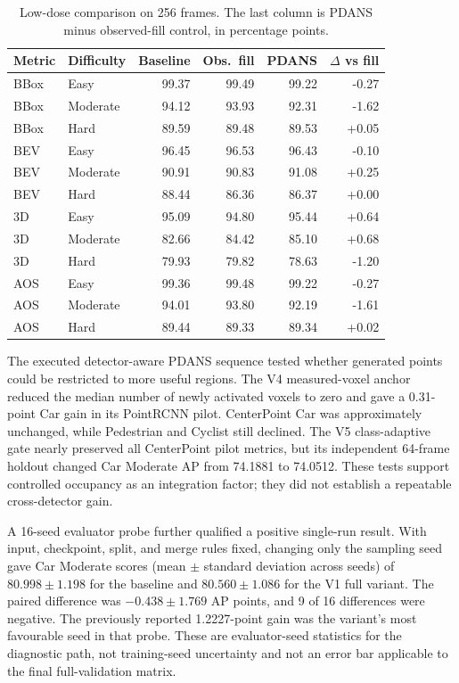 \begin{table}[!t]\centering\setlength{\tabcolsep}{4pt}
\begin{tabular}{llrrrr}\toprule
Metric & Difficulty & Baseline & Obs.\ fill & PDANS & $\Delta$ vs fill\\\midrule
BBox & Easy & 99.37 & 99.49 & 99.22 & -0.27 \\
BBox & Moderate & 94.12 & 93.93 & 92.31 & -1.62 \\
BBox & Hard & 89.59 & 89.48 & 89.53 & +0.05 \\
BEV & Easy & 96.45 & 96.53 & 96.43 & -0.10 \\
BEV & Moderate & 90.91 & 90.83 & 91.08 & +0.25 \\
BEV & Hard & 88.44 & 86.36 & 86.37 & +0.00 \\
3D & Easy & 95.09 & 94.80 & 95.44 & +0.64 \\
3D & Moderate & 82.66 & 84.42 & 85.10 & +0.68 \\
3D & Hard & 79.93 & 79.82 & 78.63 & -1.20 \\
AOS & Easy & 99.36 & 99.48 & 99.22 & -0.27 \\
AOS & Moderate & 94.01 & 93.80 & 92.19 & -1.61 \\
AOS & Hard & 89.44 & 89.33 & 89.34 & +0.02 \\
\bottomrule\end{tabular}
\caption{Low-dose comparison on 256 frames. The last column is PDANS
minus observed-fill control, in percentage points.}
\label{tab:k-dose-control}\end{table}

The executed detector-aware PDANS sequence tested whether generated
points could be restricted to more useful regions. The V4 measured-voxel
anchor reduced the median number of newly activated voxels to zero and
gave a 0.31-point Car gain in its PointRCNN pilot. CenterPoint Car
was approximately unchanged, while Pedestrian and Cyclist still declined.
The V5 class-adaptive gate nearly preserved all CenterPoint pilot metrics,
but its independent 64-frame holdout changed Car Moderate AP from
74.1881 to 74.0512. These tests support controlled occupancy as an
integration factor; they did not establish a repeatable cross-detector gain.

A 16-seed evaluator probe further qualified a positive single-run result.
With input, checkpoint, split, and merge rules fixed, changing only the
sampling seed gave Car Moderate scores (mean $\pm$ standard deviation across seeds) of $80.998\pm1.198$ for
the baseline and $80.560\pm1.086$ for the V1 full variant. The paired
difference was $-0.438\pm1.769$ AP points, and 9 of 16 differences
were negative. The previously reported 1.2227-point gain was the
variant's most favourable seed in that probe. These are evaluator-seed
statistics for the diagnostic path, not training-seed uncertainty and
not an error bar applicable to the final full-validation matrix.

\FloatBarrier

\FloatBarrier


\FloatBarrier

\FloatBarrier

